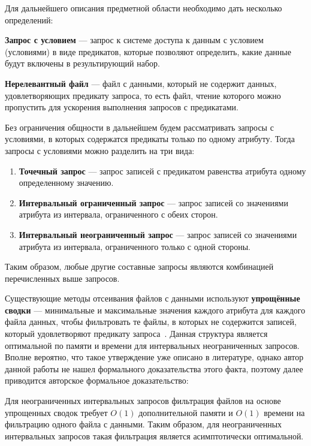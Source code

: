 Для дальнейшего описания предметной области необходимо дать несколько определений:
\begin{definition}\label{def:conditional_query}
    \textbf{Запрос с условием} --- запрос к системе доступа к данным с условием (условиями) в виде предикатов, которые позволяют определить, какие данные будут включены в результирующий набор.
\end{definition}
\begin{definition}\label{def:useless_file}
    \textbf{Нерелевантный файл} --- файл с данными, который не содержит данных, удовлетворяющих предикату запроса, то есть файл, чтение которого можно пропустить для ускорения выполнения запросов с предикатами.
\end{definition}

Без ограничения общности в дальнейшем будем рассматривать запросы с условиями, в которых содержатся предикаты только по одному атрибуту. Тогда запросы с условиями можно разделить на три вида:
\begin{enumerate}
    \item \textbf{Точечный запрос} ---  запрос записей с предикатом равенства атрибута одному определенному значению.
    \item \textbf{Интервальный ограниченный запрос} --- запрос записей со значениями атрибута из интервала, ограниченного с обеих сторон.
    \item \textbf{Интервальный неограниченный запрос} --- запрос записей со значениями атрибута из интервала, ограниченного только с одной стороны.
\end{enumerate}
Таким образом, любые другие составные запросы являются комбинацией перечисленных выше запросов.

Существующие методы отсеивания файлов с данными используют \textbf{упрощённые сводки} --- минимальные и максимальные значения каждого атрибута для каждого файла данных, чтобы фильтровать те файлы, в которых не содержится записей, который удовлетворяют предикату запроса~\cite{Extensible_data_skipping, Small_Materialized_Aggregates}. Данная структура является оптимальной по памяти и времени для интервальных неограниченных запросов. Вполне вероятно, что такое утверждение уже описано в литературе, однако автор данной работы не нашел формального доказательства этого факта, поэтому далее приводится авторское формальное доказательство:
\begin{theorem}\label{theorema}
    Для неограниченных интервальных запросов фильтрация файлов на основе упрощенных сводок требует $O(1)$ дополнительной памяти и $O(1)$ времени на фильтрацию одного файла с данными. Таким образом, для неограниченных интервальных запросов такая фильтрация является асимптотически оптимальной.
\end{theorem}
\proof

